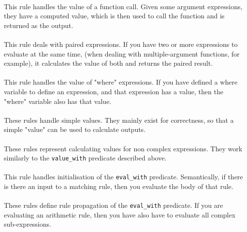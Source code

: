
\mbox{} \\
This rule handles the value of a function call. Given some argument expressions, they have a computed value, which is then used to call the function and is returned as the output. \\


\mbox{} \\
This rule deals with paired expressions. If you have two or more expressions to evaluate at the same time, (when dealing with multiple-argument functions, for example), it calculates the value of both and returns the paired result. \\


\mbox{} \\
This rule handles the value of "where" expressions. If you have defined a where variable to define an expression, and that expression has a value, then the "where" variable also has that value.\\


\mbox{} \\
These rules handle simple values. They mainly exist for correctness, so that a simple "value" can be used to calculate outputs. \\


\mbox{} \\
These rules represent calculating values for non complex expressions. They work similarly to the \lstinline{value_with} predicate described above.\\ %


\mbox{} \\
This rule handles initialisation of the \lstinline{eval_with} predicate. Semantically, if there is there an input to a matching rule, then you evaluate the body of that rule. \\ %


\mbox{} \\
These rules define rule propagation of the \lstinline{eval_with} predicate. If you are evaluating an arithmetic rule, then you have also have to evaluate all complex sub-expressions. \\ %

